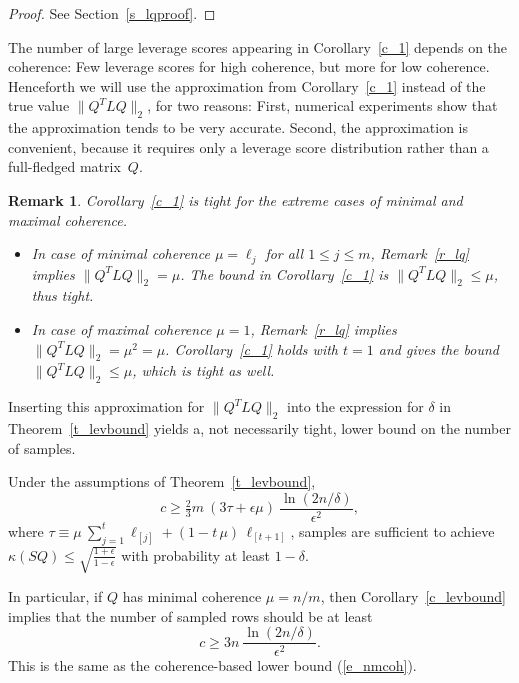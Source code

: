 \documentclass{siamltex}
\newtheorem{remark}[theorem]{Remark}
\begin{document}
\begin{proof}
See Section~\ref{s_lqproof}.
\end{proof}

The number of large leverage scores appearing in Corollary~\ref{c_1} depends on 
the coherence: Few leverage scores for high coherence, but more
for low coherence. Henceforth we will use the approximation
from Corollary~\ref{c_1} instead of the true value $\|Q^TLQ\|_2$, for two
reasons: First, numerical experiments show that the 
approximation tends to be very accurate. Second, the
approximation is convenient, because it requires 
only a leverage score distribution rather than a full-fledged matrix~$Q$.

\begin{remark}
Corollary~\ref{c_1} is tight for the extreme cases of minimal and maximal
coherence.

\begin{itemize}
\item In case of minimal coherence $\mu=\ell_j$ for all
$1\leq j\leq m$,  Remark~\ref{r_lq} implies $\|Q^TLQ\|_2=\mu$.
The bound in Corollary~\ref{c_1} is $\|Q^TLQ\|_2\leq \mu$, thus tight.

\item In case of maximal coherence $\mu=1$, Remark~\ref{r_lq} implies
$\|Q^TLQ\|_2= \mu^2=\mu$. 
Corollary~\ref{c_1} holds with $t=1$ and gives the
bound $\|Q^TLQ\|_2\leq \mu$, which is tight as well.
\end{itemize}
\end{remark}

Inserting this approximation for $\|Q^TLQ\|_2$ into the expression
for $\delta$ in Theorem~\ref{t_levbound} yields a, not necessarily tight,
lower bound on the number of samples. 

\begin{corollary}\label{c_levbound}
Under the assumptions of Theorem~\ref{t_levbound},
$$c\geq \tfrac{2}{3}m\>(3\tau+\epsilon\mu)\>
\frac{\ln(2n/\delta)}{\epsilon^2},$$
where $\tau\equiv \mu\>\sum_{j=1}^t{\ell_{[j]}}+(1-t\,\mu)\,\ell_{[t+1]}$, samples are sufficient to achieve $\kappa(SQ)\leq \sqrt{\tfrac{1+\epsilon}{1-\epsilon}}$
with probability at least $1-\delta$.
\end{corollary}

In particular, if $Q$ has minimal coherence $\mu=n/m$, then 
Corollary~\ref{c_levbound} implies that the number of sampled rows
should be at least
$$c\geq 3n \> \frac{\ln(2n/\delta)}{\epsilon^2}.$$
This is the same as the coherence-based lower bound (\ref{e_nmcoh}).
\end{document}

